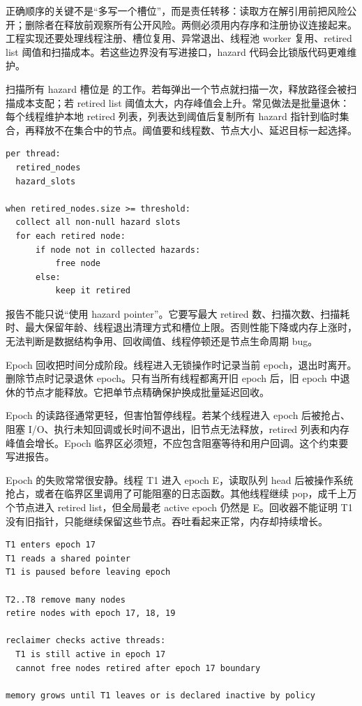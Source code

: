 正确顺序的关键不是“多写一个槽位”，而是责任转移：读取方在解引用前把风险公开；删除者在释放前观察所有公开风险。两侧必须用内存序和注册协议连接起来。工程实现还要处理线程注册、槽位复用、异常退出、线程池 worker 复用、retired list 阈值和扫描成本。若这些边界没有写进接口，hazard 代码会比锁版代码更难维护。

扫描所有 hazard 槽位是  的工作。若每弹出一个节点就扫描一次，释放路径会被扫描成本支配；若 retired list 阈值太大，内存峰值会上升。常见做法是批量退休：每个线程维护本地 retired 列表，列表达到阈值后复制所有 hazard 指针到临时集合，再释放不在集合中的节点。阈值要和线程数、节点大小、延迟目标一起选择。

\begin{lstlisting}[numbers=none,caption={Hazard retired 扫描的成本账本}]
per thread:
  retired_nodes
  hazard_slots

when retired_nodes.size >= threshold:
  collect all non-null hazard slots
  for each retired node:
      if node not in collected hazards:
          free node
      else:
          keep it retired
\end{lstlisting}

报告不能只说“使用 hazard pointer”。它要写最大 retired 数、扫描次数、扫描耗时、最大保留年龄、线程退出清理方式和槽位上限。否则性能下降或内存上涨时，无法判断是数据结构争用、回收阈值、线程停顿还是节点生命周期 bug。

Epoch 回收把时间分成阶段。线程进入无锁操作时记录当前 epoch，退出时离开。删除节点时记录退休 epoch。只有当所有线程都离开旧 epoch 后，旧 epoch 中退休的节点才能释放。它把单节点精确保护换成批量延迟回收。

Epoch 的读路径通常更轻，但害怕暂停线程。若某个线程进入 epoch 后被抢占、阻塞 I/O、执行未知回调或长时间不退出，旧节点无法释放，retired 列表和内存峰值会增长。Epoch 临界区必须短，不应包含阻塞等待和用户回调。这个约束要写进报告。

Epoch 的失败常常很安静。线程 T1 进入 epoch E，读取队列 head 后被操作系统抢占，或者在临界区里调用了可能阻塞的日志函数。其他线程继续 pop，成千上万个节点进入 retired list，但全局最老 active epoch 仍然是 E。回收器不能证明 T1 没有旧指针，只能继续保留这些节点。吞吐看起来正常，内存却持续增长。

\begin{lstlisting}[numbers=none,caption={Epoch 被暂停线程卡住的事件链}]
T1 enters epoch 17
T1 reads a shared pointer
T1 is paused before leaving epoch

T2..T8 remove many nodes
retire nodes with epoch 17, 18, 19

reclaimer checks active threads:
  T1 is still active in epoch 17
  cannot free nodes retired after epoch 17 boundary

memory grows until T1 leaves or is declared inactive by policy
\end{lstlisting}

